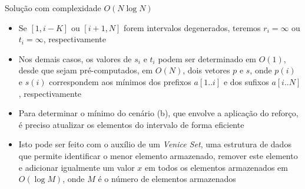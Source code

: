 \begin{frame}[fragile]{Solução com complexidade $O(N\log N)$}

    \begin{itemize}
        \item Se $[1, i - K]$ ou $[i + 1, N]$ forem intervalos degenerados, teremos $r_i = \infty$ ou
            $t_i = \infty$, respectivamente

        \item Nos demais casos, os valores de $s_i$ e $t_i$ podem ser determinado em $O(1)$, desde que
            sejam pré-computados, em $O(N)$, dois vetores $p$ e $s$, onde $p(i)$ e $s(i)$ correspondem
            aos mínimos dos prefixos $a[1..i]$ e dos sufixos $a[i..N]$, respectivamente

        \item Para determinar o mínimo do cenário (b), que envolve a aplicação do reforço, é preciso
            atualizar os elementos do intervalo de forma eficiente

        \item Isto pode ser feito com o auxílio de um \textit{Venice Set}, uma estrutura de dados que
            permite identificar o menor elemento armazenado, remover este elemento e adicionar igualmente
            um valor $x$ em todos os elementos armazenados em $O(\log M)$, onde $M$ é o número de 
            elementos armazenados
    \end{itemize}

\end{frame}

